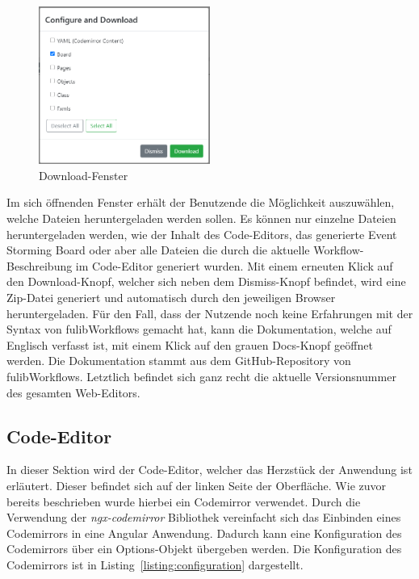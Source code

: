 \begin{figure}[h]
    \centering
    \includegraphics[width=0.5\textwidth]{images/3.2/download}
    \caption{Download-Fenster}
    \label{fig:download}
\end{figure}

Im sich öffnenden Fenster erhält der Benutzende die Möglichkeit auszuwählen, welche Dateien heruntergeladen werden sollen.
Es können nur einzelne Dateien heruntergeladen werden, wie der Inhalt des Code-Editors, das generierte Event Storming Board oder aber alle Dateien
die durch die aktuelle Workflow-Beschreibung im Code-Editor generiert wurden.
Mit einem erneuten Klick auf den Download-Knopf, welcher sich neben dem Dismiss-Knopf befindet, wird eine Zip-Datei generiert und automatisch durch den jeweiligen Browser heruntergeladen.
Für den Fall, dass der Nutzende noch keine Erfahrungen mit der Syntax von fulibWorkflows gemacht hat, kann die Dokumentation, welche auf Englisch verfasst ist, mit einem Klick
auf den grauen Docs-Knopf geöffnet werden.
Die Dokumentation stammt aus dem GitHub-Repository von fulibWorkflows.
Letztlich befindet sich ganz recht die aktuelle Versionsnummer des gesamten Web-Editors.

\subsection{Code-Editor}\label{subsec:codeeditor}
In dieser Sektion wird der Code-Editor, welcher das Herzstück der Anwendung ist erläutert.
Dieser befindet sich auf der linken Seite der Oberfläche.
Wie zuvor bereits beschrieben wurde hierbei ein Codemirror verwendet.
Durch die Verwendung der \textit{ngx-codemirror} Bibliothek vereinfacht sich das Einbinden eines Codemirrors in eine Angular Anwendung.
Dadurch kann eine Konfiguration des Codemirrors über ein Options-Objekt übergeben werden.
Die Konfiguration des Codemirrors ist in Listing~\ref{listing:configuration} dargestellt.

